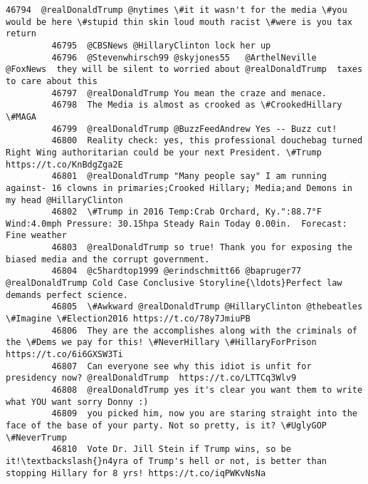 \documentclass[11pt]{article}
\begin{document}
\begin{Verbatim}[commandchars=\\\{\}]
         46794  @realDonaldTrump @nytimes \#it it wasn't for the media \#you would be here \#stupid thin skin loud mouth racist \#were is you tax return                       
         46795  @CBSNews @HillaryClinton lock her up                                                                                                                       
         46796  @Stevenwhirsch99 @skyjones55   @ArthelNeville  @FoxNews  they will be silent to worried about @realDonaldTrump  taxes to care about this                   
         46797  @realDonaldTrump You mean the craze and menace.                                                                                                            
         46798  The Media is almost as crooked as \#CrookedHillary \#MAGA                                                                                                    
         46799  @realDonaldTrump @BuzzFeedAndrew Yes -- Buzz cut!                                                                                                          
         46800  Reality check: yes, this professional douchebag turned Right Wing authoritarian could be your next President. \#Trump https://t.co/KnBdgZga2E               
         46801  @realDonaldTrump "Many people say" I am running against- 16 clowns in primaries;Crooked Hillary; Media;and Demons in my head @HillaryClinton               
         46802  \#Trump in 2016 Temp:Crab Orchard, Ky.":88.7°F Wind:4.0mph Pressure: 30.15hpa Steady Rain Today 0.00in.  Forecast: Fine weather                             
         46803  @realDonaldTrump so true! Thank you for exposing the biased media and the corrupt government.                                                              
         46804  @c5hardtop1999 @erindschmitt66 @bapruger77 @realDonaldTrump Cold Case Conclusive Storyline{\ldots}Perfect law demands perfect science.                          
         46805  \#Awkward @realDonaldTrump @HillaryClinton @thebeatles \#Imagine \#Election2016 https://t.co/78y7JmiuPB                                                       
         46806  They are the accomplishes along with the criminals of the \#Dems we pay for this! \#NeverHillary \#HillaryForPrison  https://t.co/6i6GXSW3Ti                  
         46807  Can everyone see why this idiot is unfit for presidency now? @realDonaldTrump  https://t.co/LTTCq3Wlv9                                                     
         46808  @realDonaldTrump yes it's clear you want them to write what YOU want sorry Donny :)                                                                        
         46809  you picked him, now you are staring straight into the face of the base of your party. Not so pretty, is it? \#UglyGOP \#NeverTrump                           
         46810  Vote Dr. Jill Stein if Trump wins, so be it!\textbackslash{}n4yra of Trump's hell or not, is better than stopping Hillary for 8 yrs! https://t.co/iqPWKvNsNa              
         

\end{Verbatim}
\end{document}

